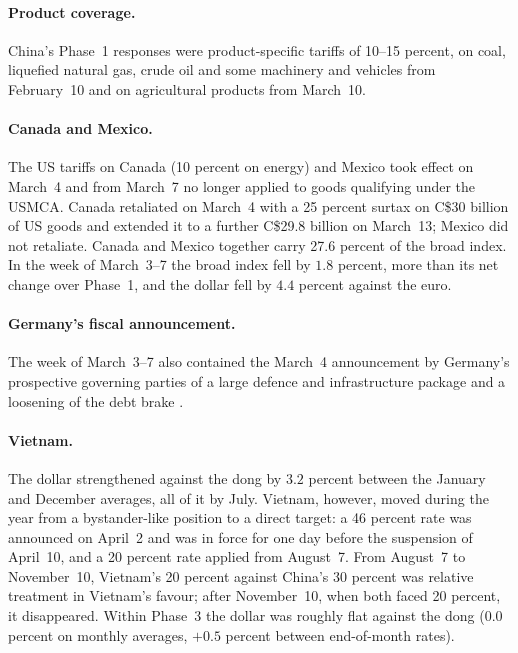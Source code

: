 \documentclass[11pt]{article}
\numberwithin{equation}{section}
\theoremstyle{plain}
\begin{document}
\paragraph{Product coverage.} China's Phase~1 responses were product-specific tariffs of 10--15 percent, on coal, liquefied natural gas, crude oil and some machinery and vehicles from February~10 and on agricultural products from March~10.

\paragraph{Canada and Mexico.} The US tariffs on Canada (10 percent on energy) and Mexico took effect on March~4 and from March~7 no longer applied to goods qualifying under the USMCA. Canada retaliated on March~4 with a 25 percent surtax on C\$30 billion of US goods \citep{canadafinance2025} and extended it to a further C\$29.8 billion on March~13; Mexico did not retaliate. Canada and Mexico together carry 27.6 percent of the broad index. In the week of March~3--7 the broad index fell by $1.8$ percent, more than its net change over Phase~1, and the dollar fell by $4.4$ percent against the euro.

\paragraph{Germany's fiscal announcement.} The week of March~3--7 also contained the March~4 announcement by Germany's prospective governing parties of a large defence and infrastructure package and a loosening of the debt brake \citep{ripper2025}.

\paragraph{Vietnam.} The dollar strengthened against the dong by $3.2$ percent between the January and December averages, all of it by July. Vietnam, however, moved during the year from a bystander-like position to a direct target: a 46 percent rate was announced on April~2 and was in force for one day before the suspension of April~10, and a 20 percent rate applied from August~7. From August~7 to November~10, Vietnam's 20 percent against China's 30 percent was relative treatment in Vietnam's favour; after November~10, when both faced 20 percent, it disappeared. Within Phase~3 the dollar was roughly flat against the dong ($0.0$ percent on monthly averages, $+0.5$ percent between end-of-month rates).
\end{document}
